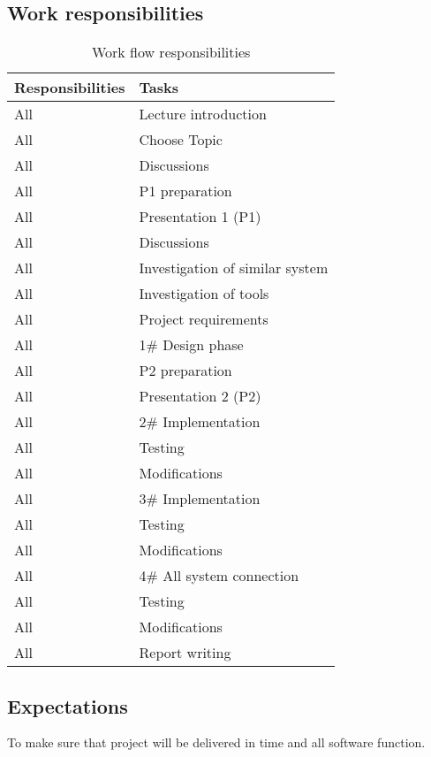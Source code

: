 \newpage
\subsection{Work responsibilities}


\begin{table}[h]
	\centering
    \begin{tabular}{ | p{3cm} | p{5cm} |}
    \hline
    \textbf{Responsibilities} &  \textbf{Tasks} \\ \hline
    All & Lecture introduction\\ \hline
    All & Choose Topic\\ \hline
    All & Discussions\\ \hline
    All & P1 preparation\\ \hline
    All & Presentation 1 (P1)\\ \hline
    All & Discussions\\ \hline
    All & Investigation of similar system\\ \hline
    All & Investigation of tools\\ \hline
    All & Project requirements\\ \hline
    All & 1\# Design phase\\ \hline
    All & P2 preparation\\ \hline
    All & Presentation 2 (P2)\\ \hline
    All & 2\# Implementation\\ \hline
    All & Testing\\ \hline
    All & Modifications\\ \hline
    All & 3\# Implementation\\ \hline
    All & Testing\\ \hline
    All & Modifications\\ \hline
    All & 4\# All system connection\\ \hline
    All & Testing\\ \hline
    All & Modifications\\ \hline
    All & Report writing\\ \hline
 		\end{tabular}
 		\caption{Work flow responsibilities}
	\label{tab:WorkFlow}
\end{table}


\subsection{Expectations}

To make sure that project will be delivered in time and all software function.
